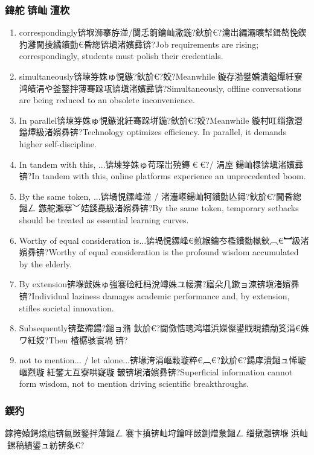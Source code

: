 ﻿\documentclass[lang=cn,11pt]{elegantbook}
\begin{document}
\subsubsection{鍏舵锛屾澶杴}

\begin{enumerate}
\item correspondingly锛堢浉搴斿湴/闅忎箣鑰屾潵鍦?鈥斺€?瀹岀編灞曠幇鍓嶅悗鍥犳灉閫掕繘鐨勯€昏緫锛塡渚嬪彞锛?Job requirements are rising; correspondingly, students must polish their credentials.
\item simultaneously锛堜笌姝ゅ悓鏃?鈥斺€?姣?Meanwhile 鏇存湁鐢婚潰鎰燂紝寮鸿皟涓や釜鐜拌薄骞跺瓨锛塡渚嬪彞锛?Simultaneously, offline conversations are being reduced to an obsolete inconvenience.
\item In parallel锛堜笌姝ゅ悓鏃讹紝骞跺垪鍦?鈥斺€?姣?Meanwhile 鏇村叿缁撴瀯鎰燂級渚嬪彞锛?Technology optimizes efficiency. In parallel, it demands higher self-discipline.
\item In tandem with this, ...锛堜笌姝ゅ苟琛岀殑鏄€︹€?/ 涓庢鍚屾椂锛塡渚嬪彞锛?In tandem with this, online platforms experience an unprecedented boom.
\item By the same token, ...锛堝悓鏍峰湴 / 渚濇嵁鍚屾牱鐨勯亾鐞?鈥斺€?閫昏緫鎺ㄥ鏃舵瀬搴﹀姞鍒嗭級渚嬪彞锛?By the same token, temporary setbacks should be treated as essential learning curves.
\item Worthy of equal consideration is...锛堝悓鏍峰€煎緱鑰冭檻鐨勬槸鈥︹€︼級渚嬪彞锛?Worthy of equal consideration is the profound wisdom accumulated by the elderly. 
\item By extension锛堢敱姝ゅ強褰硷紝杩涗竴姝ユ帹瀵?寤朵几鏉ョ湅锛塡渚嬪彞锛?Individual laziness damages academic performance and, by extension, stifles societal innovation.
\item Subsequently锛堥殢鍚?鎺ョ潃 鈥斺€?閫傚悎璁鸿堪浜嬫儏鍙戝睍鐨勪笅涓€姝ワ紝姣?Then 楂樼骇寰堝锛?
\item not to mention... / let alone...锛堟洿涓嶇敤璇粹€︹€?鈥斺€?鍚庨潰鎺ュ悕璇嶇煭璇紝鐢ㄤ互寮哄寲璇皵锛塡渚嬪彞锛?Superficial information cannot form wisdom, not to mention driving scientific breakthroughs.
\end{enumerate}

\subsubsection{鍥犳}

鎵挎媴鍔熻兘锛氱敱鐜拌薄鎺ㄥ褰卞搷锛屾垨鑰呯敱鍘熷洜鎺ㄥ缁撴灉锛堢浜屾鏍稿績鍙ュ紡锛夈€?
\end{document}
